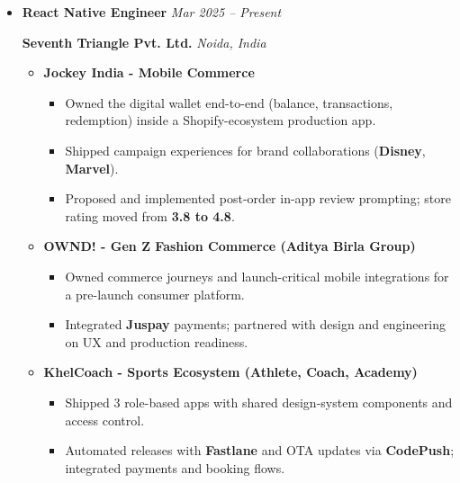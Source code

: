 \documentclass[a4paper,11pt]{article}
\begin{document}
\begin{itemize}[leftmargin=*]

\item
\textbf{React Native Engineer}
\hfill
\textit{Mar 2025 -- Present}

\textbf{Seventh Triangle Pvt. Ltd.}
\hfill
\textit{Noida, India}

\begin{itemize}[leftmargin=4mm]

\item \textbf{Jockey India - Mobile Commerce}

\begin{itemize}[leftmargin=4mm]

\item Owned the digital wallet end-to-end (balance, transactions, redemption) inside a Shopify-ecosystem production app.

\item Shipped campaign experiences for brand collaborations (\textbf{Disney}, \textbf{Marvel}).

\item Proposed and implemented post-order in-app review prompting; store rating moved from \textbf{3.8 to 4.8}.

\end{itemize}

\item \textbf{OWND! - Gen Z Fashion Commerce (Aditya Birla Group)}

\begin{itemize}[leftmargin=4mm]

\item Owned commerce journeys and launch-critical mobile integrations for a pre-launch consumer platform.

\item Integrated \textbf{Juspay} payments; partnered with design and engineering on UX and production readiness.

\end{itemize}

\item \textbf{KhelCoach - Sports Ecosystem (Athlete, Coach, Academy)}

\begin{itemize}[leftmargin=4mm]

\item Shipped 3 role-based apps with shared design-system components and access control.

\item Automated releases with \textbf{Fastlane} and OTA updates via \textbf{CodePush}; integrated payments and booking flows.


\end{itemize}
\end{itemize}
\end{itemize}
\end{document}
